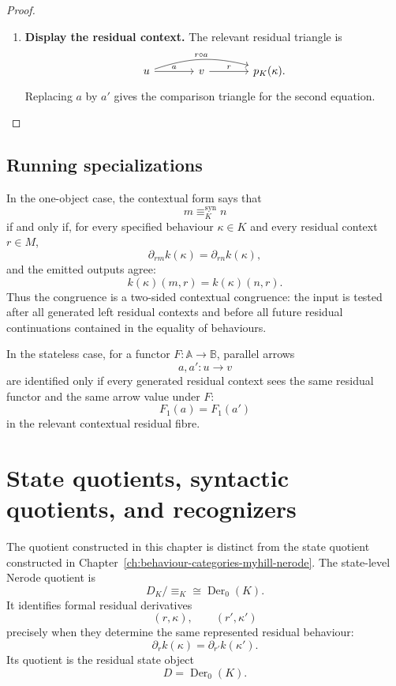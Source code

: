 \begin{proof}
\begin{enumerate}
        \item \textbf{Display the residual context.}
        The relevant residual triangle is
        \[
        \begin{tikzcd}[column sep=large, row sep=large]
            u
                \arrow[r, "a"]
                \arrow[rr, "r\circ a", bend left=16]
            &
            v
                \arrow[r, "r"]
            &
            p_K(\kappa).
        \end{tikzcd}
        \]
        Replacing \(a\) by \(a'\) gives the comparison triangle for the second
        equation.
    \end{enumerate}
\end{proof}

\subsection{Running specializations}
\label{subsec:syn-to-context-running-specializations}

In the one-object case, the contextual form says that
\[
    m\equiv_K^{\mathrm{syn}}n
\]
if and only if, for every specified behaviour \(\kappa\in K\) and every
residual context \(r\in M\),
\[
    \partial_{rm}k(\kappa)
    =
    \partial_{rn}k(\kappa),
\]
and the emitted outputs agree:
\[
    k(\kappa)(m,r)=k(\kappa)(n,r).
\]
Thus the congruence is a two-sided contextual congruence: the input is tested
after all generated left residual contexts and before all future residual
continuations contained in the equality of behaviours.

In the stateless case, for a functor \(F:\mathbb A\to\mathbb B\), parallel
arrows
\[
    a,a':u\to v
\]
are identified only if every generated residual context sees the same residual
functor and the same arrow value under \(F\):
\[
    F_1(a)=F_1(a')
\]
in the relevant contextual residual fibre.

\section{State quotients, syntactic quotients, and recognizers}
\label{sec:syn-to-state-vs-syntactic-recognizers}

The quotient constructed in this chapter is distinct from the state quotient
constructed in Chapter~\ref{ch:behaviour-categories-myhill-nerode}. The
state-level Nerode quotient is
\[
    D_K/{\equiv_K}
    \cong
    \operatorname{Der}_0(K).
\]
It identifies formal residual derivatives
\[
    (r,\kappa),
    \qquad
    (r',\kappa')
\]
precisely when they determine the same represented residual behaviour:
\[
    \partial_r k(\kappa)
    =
    \partial_{r'}k(\kappa').
\]
Its quotient is the residual state object
\[
    D=\operatorname{Der}_0(K).
\]

